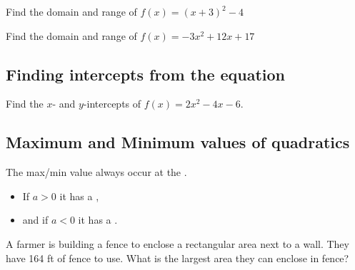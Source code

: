 \begin{exercise}
Find the domain and range of $f(x)=(x+3)^2-4$
\end{exercise}
\begin{solution}[2in]

\end{solution}

\vspace{0.5em}

\begin{exercise}
Find the domain and range of $f(x)=-3x^2+12x+17$
\end{exercise}
\begin{solution}[3.5in]

\end{solution}

\subsection{Finding intercepts from the equation}

\begin{exercise}
Find the $x$- and $y$-intercepts of $f(x)=2x^2-4x-6$.
\end{exercise}
\begin{solution}[3in]

\end{solution}

\subsection{Maximum and Minimum values of quadratics}

\begin{note}
The max/min value always occur at the .
\begin{itemize}
    \item If $a>0$ it has a ,
    \item and if $a<0$ it has a .
\end{itemize}
\end{note}

\begin{exercise}
A farmer is building a fence to enclose a rectangular area next to a wall.
They have 164 ft of fence to use. What is the largest area they can enclose in fence?
\end{exercise}
\begin{solution}[3in]

\end{solution}


